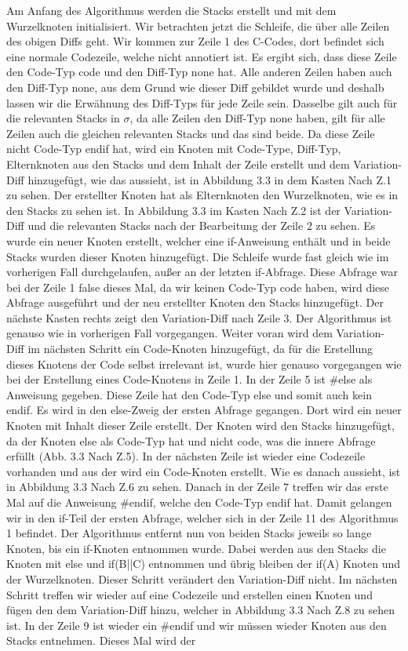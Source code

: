 Am Anfang des Algorithmus werden die Stacks erstellt und mit dem Wurzelknoten  initialisiert. Wir betrachten jetzt die Schleife, die über alle Zeilen des obigen Diffs geht. Wir kommen zur Zeile 1 des C-Codes, dort befindet sich eine normale Codezeile, welche nicht annotiert ist. Es ergibt sich, dass diese Zeile den Code-Typ code und den Diff-Typ none hat. Alle anderen Zeilen haben auch den Diff-Typ none, aus dem Grund wie dieser Diff gebildet wurde und deshalb lassen wir die Erwähnung des Diff-Typs für jede Zeile sein. Dasselbe gilt auch für die relevanten Stacks in $\sigma$, da alle Zeilen den Diff-Typ none haben, gilt für alle Zeilen auch die gleichen relevanten Stacks und das sind beide. Da diese Zeile nicht Code-Typ endif hat, wird ein Knoten mit Code-Type, Diff-Typ, Elternknoten aus den Stacks und dem Inhalt der Zeile erstellt und dem Variation-Diff hinzugefügt, wie das aussieht, ist in Abbildung 3.3 in dem Kasten \glqq Nach Z.1\grqq{} zu sehen. Der erstellter Knoten hat als Elternknoten den Wurzelknoten, wie es in den Stacks zu sehen ist. In Abbildung 3.3 im Kasten \glqq Nach Z.2\grqq{} ist der Variation-Diff und die relevanten Stacks nach der Bearbeitung der Zeile 2 zu sehen. Es wurde ein neuer Knoten erstellt, welcher eine if-Anweisung enthält und in beide Stacks wurden dieser Knoten hinzugefügt. Die Schleife wurde fast gleich wie im vorherigen Fall durchgelaufen, außer an der letzten if-Abfrage. Diese Abfrage war bei der Zeile 1 false dieses Mal, da wir keinen Code-Typ code haben, wird diese Abfrage ausgeführt und der neu erstellter Knoten den Stacks hinzugefügt. Der nächste Kasten rechts zeigt den Variation-Diff nach Zeile 3. Der Algorithmus ist genauso wie in vorherigen Fall vorgegangen. Weiter voran wird dem Variation-Diff im nächsten Schritt ein Code-Knoten hinzugefügt, da für die Erstellung dieses Knotens der Code selbst irrelevant ist, wurde hier genauso vorgegangen wie bei der Erstellung eines Code-Knotens in Zeile 1. In der Zeile 5 ist \#else als Anweisung gegeben. Diese Zeile hat den Code-Typ else und somit auch kein endif. Es wird in den else-Zweig der ersten Abfrage gegangen. Dort wird ein neuer Knoten mit Inhalt dieser Zeile erstellt. Der Knoten wird den Stacks hinzugefügt, da der Knoten else  als Code-Typ hat und nicht code, was die innere Abfrage erfüllt (Abb. 3.3 \glqq Nach Z.5\grqq{}). In der nächsten Zeile ist wieder eine Codezeile vorhanden und aus der wird ein Code-Knoten erstellt. Wie es danach aussieht, ist in Abbildung 3.3 \glqq Nach Z.6\grqq{} zu sehen. Danach in der Zeile 7 treffen wir das erste Mal auf die Anweisung \#endif, welche den Code-Typ endif hat. Damit gelangen wir in den if-Teil der ersten Abfrage, welcher sich in der Zeile 11 des Algorithmus 1 befindet. Der Algorithmus entfernt nun von beiden Stacks jeweils so lange Knoten, bis ein if-Knoten entnommen wurde. Dabei werden aus den Stacks die Knoten mit else und if(B||C) entnommen und übrig bleiben der if(A) Knoten und der Wurzelknoten. Dieser Schritt verändert den Variation-Diff nicht. Im nächsten Schritt treffen wir wieder auf eine Codezeile und erstellen einen Knoten und fügen den dem Variation-Diff hinzu, welcher in Abbildung 3.3 \glqq Nach Z.8\grqq{} zu sehen ist. In der Zeile 9 ist wieder ein \#endif und wir müssen wieder Knoten aus den Stacks entnehmen. Dieses Mal wird der 